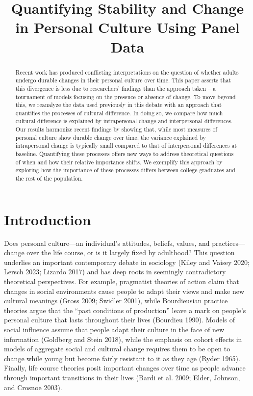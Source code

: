 \documentclass[
  12pt,
]{article}
\title{Quantifying Stability and Change in Personal Culture Using Panel
Data}
\author{}
\date{\vspace{-2.5em}}
\begin{document}
\maketitle
\begin{abstract}
Recent work has produced conflicting interpretations on the question of
whether adults undergo durable changes in their personal culture over
time. This paper asserts that this divergence is less due to
researchers' findings than the approach taken -- a tournament of models
focusing on the presence or absence of change. To move beyond this, we
reanalyze the data used previously in this debate with an approach that
quantifies the processes of cultural difference. In doing so, we compare
how much cultural difference is explained by intrapersonal change and
interpersonal differences. Our results harmonize recent findings by
showing that, while most measures of personal culture show durable
change over time, the variance explained by intrapersonal change is
typically small compared to that of interpersonal differences at
baseline. Quantifying these processes offers new ways to address
theoretical questions of when and how their relative importance shifts.
We exemplify this approach by exploring how the importance of these
processes differs between college graduates and the rest of the
population.
\end{abstract}

\hypertarget{introduction}{%
\section{Introduction}\label{introduction}}

Does personal culture---an individual's attitudes, beliefs, values, and
practices---change over the life course, or is it largely fixed by
adulthood? This question underlies an important contemporary debate in
sociology (Kiley and Vaisey 2020; Lersch 2023; Lizardo 2017) and has
deep roots in seemingly contradictory theoretical perspectives. For
example, pragmatist theories of action claim that changes in social
environments cause people to adapt their views and make new cultural
meanings (Gross 2009; Swidler 2001), while Bourdieusian practice
theories argue that the ``past conditions of production'' leave a mark
on people's personal culture that lasts throughout their lives (Bourdieu
1990). Models of social influence assume that people adapt their culture
in the face of new information (Goldberg and Stein 2018), while the
emphasis on cohort effects in models of aggregate social and cultural
change requires them to be open to change while young but become fairly
resistant to it as they age (Ryder 1965). Finally, life course theories
posit important changes over time as people advance through important
transitions in their lives (Bardi et al. 2009; Elder, Johnson, and
Crosnoe 2003).
\end{document}
